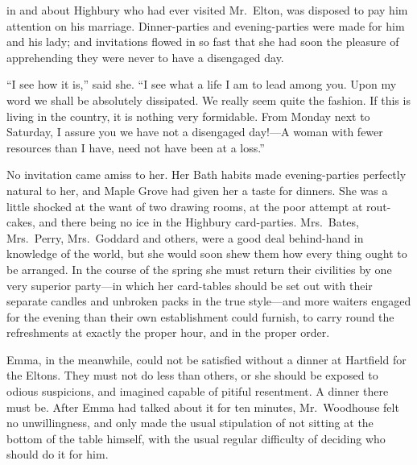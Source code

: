  in and about Highbury who had ever visited Mr.\ Elton,
was disposed to pay him attention on his marriage.  Dinner-parties and
evening-parties were made for him and his lady; and invitations
flowed in so fast that she had soon the pleasure of apprehending
they were never to have a disengaged day.

``I see how it is,'' said she.  ``I see what a life I am to lead
among you.  Upon my word we shall be absolutely dissipated.
We really seem quite the fashion.  If this is living in the country,
it is nothing very formidable.  From Monday next to Saturday,
I assure you we have not a disengaged day!---A woman with fewer
resources than I have, need not have been at a loss.''

No invitation came amiss to her.  Her Bath habits made evening-parties
perfectly natural to her, and Maple Grove had given her a taste
for dinners.  She was a little shocked at the want of two
drawing rooms, at the poor attempt at rout-cakes, and there being
no ice in the Highbury card-parties. Mrs.\ Bates, Mrs.\ Perry,
Mrs.\ Goddard and others, were a good deal behind-hand in knowledge
of the world, but she would soon shew them how every thing ought
to be arranged.  In the course of the spring she must return their
civilities by one very superior party---in which her card-tables
should be set out with their separate candles and unbroken packs
in the true style---and more waiters engaged for the evening
than their own establishment could furnish, to carry round
the refreshments at exactly the proper hour, and in the proper order.

Emma, in the meanwhile, could not be satisfied without a dinner
at Hartfield for the Eltons.  They must not do less than others,
or she should be exposed to odious suspicions, and imagined capable
of pitiful resentment.  A dinner there must be.  After Emma had
talked about it for ten minutes, Mr.\ Woodhouse felt no unwillingness,
and only made the usual stipulation of not sitting at the bottom
of the table himself, with the usual regular difficulty of deciding
who should do it for him.

